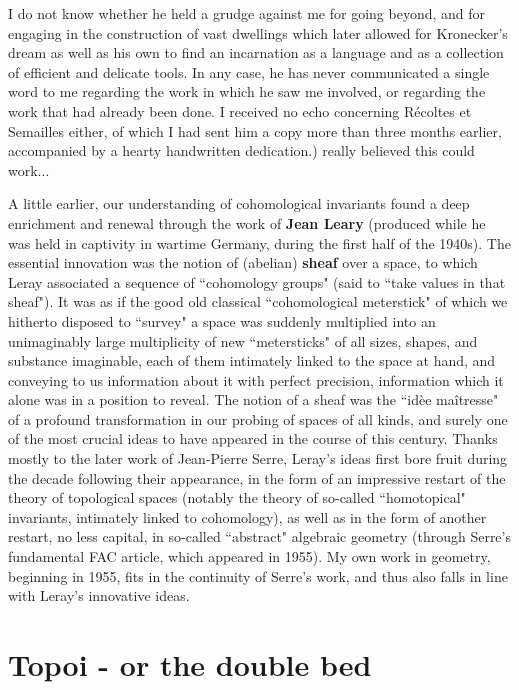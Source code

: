 {I do not know whether he held a grudge against me for going beyond, and for engaging in the construction of vast dwellings which later allowed for Kronecker's dream as well as his own to find an incarnation as a language and as a collection of efficient and delicate tools. In any case, he has never communicated a single word to me regarding the work in which he saw me involved, or regarding the work that had already been done. I received no echo concerning R\'ecoltes et Semailles either, of which I had sent him a copy more than three months earlier, accompanied by a hearty handwritten dedication.}) really believed this could work...

A little earlier, our understanding of cohomological invariants found a deep enrichment and renewal through the work of \textbf{Jean Leary} (produced while he was held in captivity in wartime Germany,  during the first half of the 1940s). The essential innovation was the notion of (abelian) \textbf{sheaf} over a space, to which Leray associated a sequence of ``cohomology groups" (said to ``take values in that sheaf"). It was as if the good old classical ``cohomological meterstick" of which we hitherto disposed to ``survey" a space was suddenly multiplied into an unimaginably large multiplicity of new ``metersticks" of all sizes, shapes, and substance imaginable, each of them intimately linked to the space at hand, and conveying to us information about it with perfect precision, information which it alone was in a position to reveal. The notion of a sheaf was the ``id\`ee ma\^itresse" of a profound transformation in our probing of spaces of all kinds, and surely one of the most crucial ideas to have appeared in the course of this century. Thanks mostly to the later work of Jean-Pierre Serre, Leray's ideas first bore fruit during the decade following their appearance, in the form of an impressive restart of the theory of topological spaces (notably the theory of so-called ``homotopical" invariants, intimately linked to cohomology), as well as in the form of another restart, no less capital, in so-called ``abstract" algebraic geometry (through Serre's fundamental FAC article, which appeared in 1955). My own work in geometry, beginning in 1955, fits in the continuity of Serre's work, and thus also falls in line with Leray's innovative ideas. 

\section{Topoi - or the double bed}

